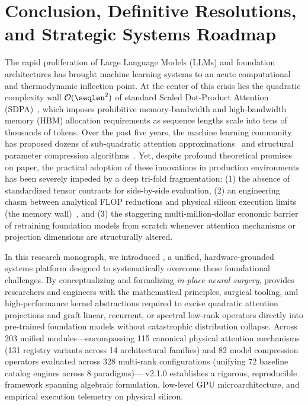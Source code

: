 
\section{Conclusion, Definitive Resolutions, and Strategic Systems Roadmap}
\label{sec:conclusion}

The rapid proliferation of Large Language Models (LLMs) and foundation architectures has brought machine learning systems to an acute computational and thermodynamic inflection point.
At the center of this crisis lies the quadratic complexity wall $\mathcal{O}(\seqlen^2)$ of standard Scaled Dot-Product Attention (SDPA)~\cite{vaswani2017attention}, which imposes prohibitive memory-bandwidth and high-bandwidth memory (HBM) allocation requirements as sequence lengths scale into tens of thousands of tokens.
Over the past five years, the machine learning community has proposed dozens of sub-quadratic attention approximations~\cite{katharopoulos2020transformers,choromanski2021performer,qin2022cosformer,gu2022mamba} and structural parameter compression algorithms~\cite{wang2024svdllm,yuan2023asvd,xiao2023smoothquant,frantar2022sparsegpt}.
Yet, despite profound theoretical promises on paper, the practical adoption of these innovations in production environments has been severely impeded by a deep tri-fold fragmentation:
(1) the absence of standardized tensor contracts for side-by-side evaluation,
(2) an engineering chasm between analytical FLOP reductions and physical silicon execution limits (the memory wall)~\cite{williams2009roofline}, and
(3) the staggering multi-million-dollar economic barrier of retraining foundation models from scratch whenever attention mechanisms or projection dimensions are structurally altered.

In this research monograph, we introduced \neuralops{}, a unified, hardware-grounded systems platform designed to systematically overcome these foundational challenges.
By conceptualizing and formalizing \emph{in-place neural surgery}, \neuralops{} provides researchers and engineers with the mathematical principles, surgical tooling, and high-performance kernel abstractions required to excise quadratic attention projections and graft linear, recurrent, or spectral low-rank operators directly into pre-trained foundation models without catastrophic distribution collapse.
Across 203 unified modules—encompassing 115 canonical physical attention mechanisms (131 registry variants across 14 architectural families) and 82 model compression operators evaluated across 328 multi-rank configurations (unifying 72 baseline catalog engines across 8 paradigms)—\neuralops{} v2.1.0 establishes a rigorous, reproducible framework spanning algebraic formulation, low-level GPU microarchitecture, and empirical execution telemetry on physical silicon.

